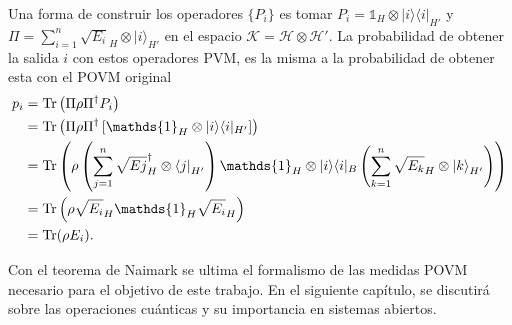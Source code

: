 Una forma de construir los operadores $\{P_i\}$ es tomar  $P _{i}=\mathds{1} _{H}\otimes
|i\rangle \langle i|_{H'}$ y
$\Pi=\sum _{i=1}^{n}{\sqrt {E_{i}} }_{H}\otimes {|i\rangle }_{H'}$ en el espacio $\mathcal{K}=\mathcal{H}\otimes\mathcal{H'}$. La
probabilidad de obtener la salida $i$ con estos operadores PVM, es la misma a
la probabilidad de obtener esta con el POVM original {\cite{2007geometry}}
\begin{equation}
 \begin{split}
 p_i&=\tr \left(\Pi\rho\Pi^{\dagger }P _{i}\right)\\
 &=\tr \left(\Pi\rho \Pi^{\dagger }\left[\mathds{1}_{H}\otimes |i\rangle \langle i|_{H'}\right]\right)\\
 &=\tr \left(\rho\left(\sum _{j=1}^{n}{\sqrt {E{j} }}_{H}^{\dagger }\otimes {\langle j|}_{H'}\right)\mathds{1} _{H}\otimes |i\rangle \langle i|_{B}\left(\sum _{k=1}^{n}{\sqrt {E_{k} }}_{H}\otimes {|k\rangle }_{H'}\right)\right)\\
 &=\tr \left(\rho {\sqrt {E_{i} }}_{H}\mathds{1} _{H}{\sqrt {E_{i} }}_{H}\right)\\
 &=\tr (\rho E_{i}).
 \end{split}
\end{equation}

Con el teorema de Naimark  se ultima el formalismo de las medidas POVM necesario para el objetivo de este trabajo. En el siguiente capítulo, se discutirá sobre las operaciones cuánticas y su importancia en sistemas abiertos.


